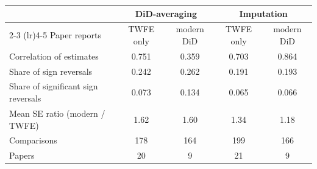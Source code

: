 \begin{tabular}{lcccc}
\toprule
 & \multicolumn{2}{c}{DiD-averaging} & \multicolumn{2}{c}{Imputation} \\
\cmidrule(lr){2-3} \cmidrule(lr){4-5}
Paper reports & TWFE only & modern DiD & TWFE only & modern DiD \\
\midrule
Correlation of estimates & 0.751 & 0.359 & 0.703 & 0.864 \\
Share of sign reversals & 0.242 & 0.262 & 0.191 & 0.193 \\
Share of significant sign reversals & 0.073 & 0.134 & 0.065 & 0.066 \\
Mean SE ratio (modern / TWFE) & 1.62 & 1.60 & 1.34 & 1.18 \\
\midrule
Comparisons & 178 & 164 & 199 & 166 \\
Papers & 20 & 9 & 21 & 9 \\
\bottomrule
\end{tabular}
